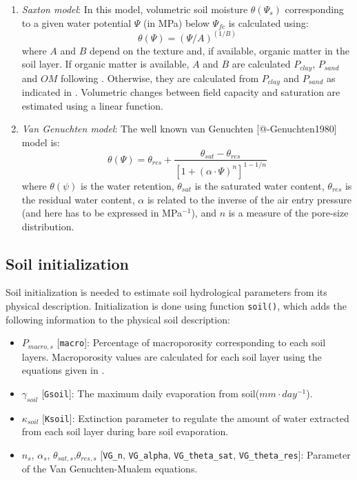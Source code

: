\documentclass[]{book}
\providecommand{\tightlist}{%
  \setlength{\itemsep}{0pt}\setlength{\parskip}{0pt}}
\begin{document}
\begin{enumerate}
\def\labelenumi{\arabic{enumi}.}
\tightlist
\item
  \emph{Saxton model}: In this model, volumetric soil moisture \(\theta(\Psi_s)\) corresponding to a given water potential \(\Psi\) (in MPa) below \(\Psi_{fc}\) is calculated using:
  \begin{equation}\theta(\Psi) = (\Psi/A)^{(1/B)}\end{equation}
  where \(A\) and \(B\) depend on the texture and, if available, organic matter in the soil layer. If organic matter is available, \(A\) and \(B\) are calculated \(P_{clay}\), \(P_{sand}\) and \(OM\) following \citet{Saxton2006}. Otherwise, they are calculated from \(P_{clay}\) and \(P_{sand}\) as indicated in \citet{Saxton1986}. Volumetric changes between field capacity and saturation are estimated using a linear function.
\item
  \emph{Van Genuchten model}: The well known van Genuchten {[}@-Genuchten1980{]} model is:
  \begin{equation}\theta(\Psi) = \theta_{res}+\frac{\theta_{sat}-\theta_{res}}{\left[1+ (\alpha \cdot \Psi)^n \right]^{1-1/n}}\end{equation}
  where \(\theta(\psi)\) is the water retention, \(\theta_{sat}\) is the saturated water content, \(\theta_{res}\) is the residual water content, \(\alpha\) is related to the inverse of the air entry pressure (and here has to be expressed in MPa\(^{-1}\)), and \(n\) is a measure of the pore-size distribution.
\end{enumerate}

\hypertarget{soil-initialization}{%
\subsection{Soil initialization}\label{soil-initialization}}

Soil initialization is needed to estimate soil hydrological parameters from its physical description. Initialization is done using function \texttt{soil()}, which adds the following information to the physical soil description:

\begin{itemize}
\tightlist
\item
  \(P_{macro, s}\) {[}\texttt{macro}{]}: Percentage of macroporosity corresponding to each soil layers. Macroporosity values are calculated for each soil layer using the equations given in \citet{Stolf2011}.
\item
  \(\gamma_{soil}\) {[}\texttt{Gsoil}{]}: The maximum daily evaporation from soil(\(mm \cdot day^{-1}\)).
\item
  \(\kappa_{soil}\) {[}\texttt{Ksoil}{]}: Extinction parameter to regulate the amount of water extracted from each soil layer during bare soil evaporation.
\item
  \(n_{s}\), \(\alpha_{s}\), \(\theta_{sat,s}\),\(\theta_{res,s}\) {[}\texttt{VG\_n}, \texttt{VG\_alpha}, \texttt{VG\_theta\_sat}, \texttt{VG\_theta\_res}{]}: Parameter of the Van Genuchten-Mualem equations.
\end{itemize}
\end{document}
